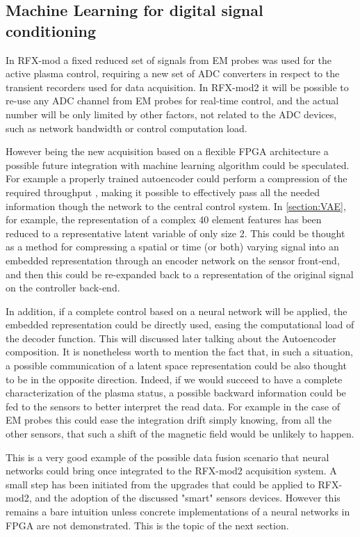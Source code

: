 \subsection*{Machine Learning for digital signal conditioning}

In RFX-mod a fixed reduced set of signals from EM probes was used for the active plasma control, requiring a new set of ADC converters in respect to the transient recorders used for data acquisition. In RFX-mod2 it will be possible to re-use any ADC channel from EM probes for real-time control, and the actual number will be only limited by other factors, not related to the ADC devices, such as network bandwidth or control computation load. 

However being the new acquisition based on a flexible FPGA architecture a possible future integration with machine learning algorithm could be speculated.
For example a properly trained autoencoder could perform a compression of the required throughput \cite{Zebang:2019:DCA:3313950.3313965}, making it possible to effectively pass all the needed information though the network to the central control system.
In \cref{section:VAE}, for example, the representation of a complex 40 element features has been reduced to a representative latent variable of only size 2. 
This could be thought as a method for compressing a spatial or time (or both) varying signal into an embedded representation through an encoder network on the sensor front-end, and then this could be re-expanded back to a representation of the original signal on the controller back-end.

In addition, if a complete control based on a neural network will be applied, the embedded representation could be directly used, easing the computational load of the decoder function. This will discussed later talking about the Autoencoder composition.
It is nonetheless worth to mention the fact that, in such a situation, a possible communication of a latent space representation could be also thought to be in the opposite direction. Indeed, if we would succeed to have a complete characterization of the plasma status, a possible backward information could be fed to the sensors to better interpret the read data.
For example in the case of EM probes this could ease the integration drift simply knowing, from all the other sensors, that such a shift of the magnetic field would be unlikely to happen.

This is a very good example of the possible data fusion scenario that neural networks could bring once integrated to the RFX-mod2 acquisition system.
A small step has been initiated from the upgrades that could be applied to RFX-mod2, and the adoption of the discussed "smart" sensors devices.
However this remains a bare intuition unless concrete implementations of a neural networks in FPGA are not demonstrated.
This is the topic of the next section.










